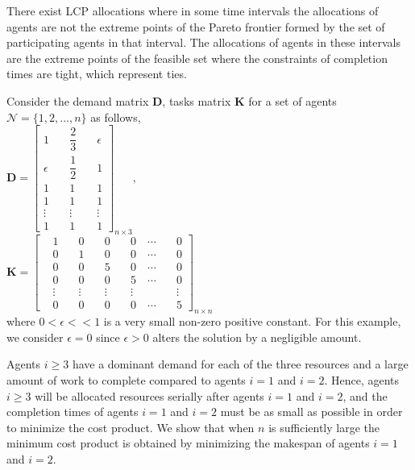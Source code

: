 \documentclass[letterpaper]{article} %
\theoremstyle{definition}
\newenvironment{customexample}[1]
  {\renewcommand\theinnercustomexample{#1}\innercustomexample}
  {\endinnercustomexample}
\begin{document}
\begin{customexample}{1} \label{lcp-tie}

There exist LCP allocations where in some time intervals the allocations of agents are not the extreme points of the Pareto frontier formed by the set of participating agents in that interval. The allocations of agents in these intervals are the extreme points of the feasible set where the constraints of completion times are tight, which represent ties. 

\noindent Consider the demand matrix $\mathbf{D}$, tasks matrix $\mathbf{K}$ for a set of agents $\mathcal{N} = \{1,2, ...,n\}$ as follows,\\

$\mathbf{D} = \begin{bmatrix} 1 \quad & \dfrac{2}{3} \quad & \epsilon 
\\[6 pt] \epsilon \quad & \dfrac{1}{2} \quad & 1
\\[6 pt] 1    \quad & 1 \quad & 1 
\\ 1    \quad & 1 \quad & 1
\\ \vdots \quad & \vdots \quad & \vdots
\\ 1    \quad & 1 \quad & 1\end{bmatrix}_{n \times 3}, \quad$\\[6 pt]


$\mathbf{K} = \begin{bmatrix} & 1 \quad & 0 \quad & 0 \quad & 0 \quad \cdots \quad & 0 
\\ & 0 \quad & 1 \quad & 0 \quad & 0 \quad \cdots \quad & 0
\\ & 0 \quad & 0 \quad & 5 \quad & 0 \quad \cdots \quad & 0 
\\ & 0 \quad & 0 \quad & 0 \quad & 5 \quad \cdots \quad & 0
\\ & \vdots \quad & \vdots \quad & \vdots \quad & \vdots \quad & \vdots
\\& 0 \quad & 0 \quad  & 0 \quad & 0 \quad \cdots \quad & 5 
\end{bmatrix}_{n \times n}$\\[6 pt]

\noindent where $0 < \epsilon << 1$ is a very small non-zero positive constant. For this example, we consider $\epsilon = 0$ since $\epsilon > 0$ alters the solution by a negligible amount. 

Agents $i \geq 3$ have a dominant demand for each of the three resources and a large amount of work to complete compared to agents $ i = 1$ and $ i = 2$. Hence, agents $i \geq 3$ will be allocated resources serially after agents $i = 1$ and  $i = 2$, and the completion times of agents $ i = 1$ and $ i = 2$ must be as small as possible in order to minimize the cost product. We show that when $n$ is sufficiently large the minimum cost product is obtained by minimizing the makespan of agents $ i = 1$ and $ i = 2$. 


\end{customexample}
\end{document}
